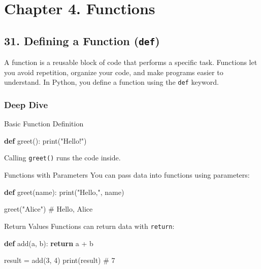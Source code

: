 \documentclass[
  letterpaper,
  DIV=11,
  numbers=noendperiod]{scrreprt}
\newenvironment{Shaded}{\begin{snugshade}}{\end{snugshade}}
\newcommand{\BuiltInTok}[1]{\textcolor[rgb]{0.00,0.23,0.31}{#1}}
\newcommand{\CommentTok}[1]{\textcolor[rgb]{0.37,0.37,0.37}{#1}}
\newcommand{\ControlFlowTok}[1]{\textcolor[rgb]{0.00,0.23,0.31}{\textbf{#1}}}
\newcommand{\DecValTok}[1]{\textcolor[rgb]{0.68,0.00,0.00}{#1}}
\newcommand{\KeywordTok}[1]{\textcolor[rgb]{0.00,0.23,0.31}{\textbf{#1}}}
\newcommand{\NormalTok}[1]{\textcolor[rgb]{0.00,0.23,0.31}{#1}}
\newcommand{\OperatorTok}[1]{\textcolor[rgb]{0.37,0.37,0.37}{#1}}
\newcommand{\StringTok}[1]{\textcolor[rgb]{0.13,0.47,0.30}{#1}}
\begin{document}
\section{Chapter 4. Functions}\label{chapter-4.-functions}

\subsection{\texorpdfstring{31. Defining a Function
(\texttt{def})}{31. Defining a Function (def)}}\label{defining-a-function-def}

A function is a reusable block of code that performs a specific task.
Functions let you avoid repetition, organize your code, and make
programs easier to understand. In Python, you define a function using
the \texttt{def} keyword.

\subsubsection{Deep Dive}\label{deep-dive-30}

Basic Function Definition

\begin{Shaded}
\begin{Highlighting}[]
\KeywordTok{def}\NormalTok{ greet():}
    \BuiltInTok{print}\NormalTok{(}\StringTok{"Hello!"}\NormalTok{)}
\end{Highlighting}
\end{Shaded}

Calling \texttt{greet()} runs the code inside.

Functions with Parameters You can pass data into functions using
parameters:

\begin{Shaded}
\begin{Highlighting}[]
\KeywordTok{def}\NormalTok{ greet(name):}
    \BuiltInTok{print}\NormalTok{(}\StringTok{"Hello,"}\NormalTok{, name)}

\NormalTok{greet(}\StringTok{"Alice"}\NormalTok{)   }\CommentTok{\# Hello, Alice}
\end{Highlighting}
\end{Shaded}

Return Values Functions can return data with \texttt{return}:

\begin{Shaded}
\begin{Highlighting}[]
\KeywordTok{def}\NormalTok{ add(a, b):}
    \ControlFlowTok{return}\NormalTok{ a }\OperatorTok{+}\NormalTok{ b}

\NormalTok{result }\OperatorTok{=}\NormalTok{ add(}\DecValTok{3}\NormalTok{, }\DecValTok{4}\NormalTok{)}
\BuiltInTok{print}\NormalTok{(result)   }\CommentTok{\# 7}
\end{Highlighting}
\end{Shaded}
\end{document}
